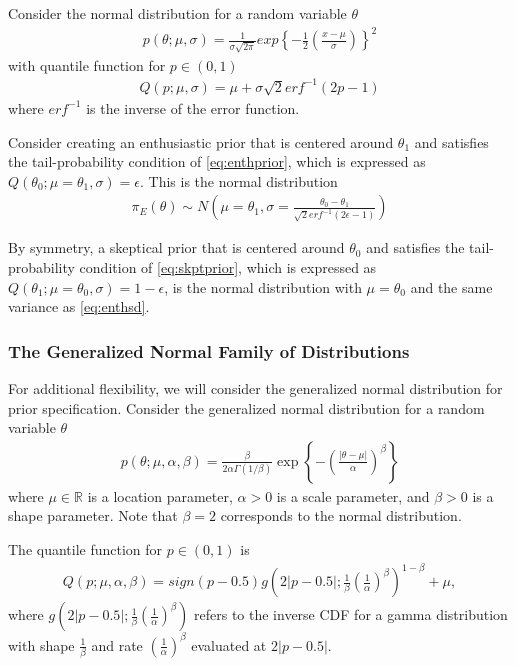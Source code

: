 \documentclass[12pt]{article}
\begin{document}
Consider the normal distribution for a random variable $\theta$
\begin{align}
p(\theta;\mu,\sigma)=\frac{1}{\sigma\sqrt{2\pi}}exp\left\{-\frac{1}{2}\left(\frac{x-\mu}{\sigma}\right)\right\}^2
\end{align}
with quantile function for $p\in(0,1)$
\begin{align}
Q(p;\mu,\sigma)=\mu+\sigma\sqrt{2}erf^{-1}(2p-1)
\end{align}
where $erf^{-1}$ is the inverse of the error function.

Consider creating an enthusiastic prior that is centered around $\theta_1$ and satisfies the tail-probability condition of \eqref{eq:enthprior}, which is expressed as $Q(\theta_0;\mu=\theta_1,\sigma)=\epsilon$. This is the normal distribution 
\begin{align}\label{eq:enthsd}
\pi_E(\theta)\sim N\left(\mu=\theta_1,\sigma=\frac{\theta_0-\theta_1}{\sqrt{2}erf^{-1}(2\epsilon-1)}\right)
\end{align}

By symmetry, a skeptical prior that is centered around $\theta_0$ and satisfies the tail-probability condition of \eqref{eq:skptprior}, which is expressed as $Q(\theta_1;\mu=\theta_0,\sigma)=1-\epsilon$, is the normal distribution with $\mu=\theta_0$ and the same variance as \eqref{eq:enthsd}.

\subsubsection{The Generalized Normal Family of Distributions}
For additional flexibility, we will consider the generalized normal distribution \citep{Nadarajah2005} for prior specification. Consider the generalized normal distribution for a random variable $\theta$ 
\begin{align}\label{eq:generalizednormalkernel}
p(\theta;\mu,\alpha,\beta)=\frac{\beta}{2\alpha\Gamma(1/\beta)}\exp\left\{-\left(\frac{|\theta-\mu|}{\alpha}\right)^\beta\right\}
\end{align} where $\mu\in\mathbb{R}$ is a location parameter, $\alpha>0$ is a scale parameter, and $\beta>0$ is a shape parameter. Note that $\beta=2$ corresponds to the normal distribution. 

The quantile function for $p\in (0,1)$ is 
\begin{align}
Q(p;\mu,\alpha,\beta)=sign(p-0.5) g\left(2|p-0.5|;\frac{1}{\beta}\left(\frac{1}{\alpha}\right)^{\beta}\right)^{1-\beta}+\mu,
\end{align}
where $g\left(2|p-0.5|;\frac{1}{\beta}\left(\frac{1}{\alpha}\right)^{\beta}\right)$ refers to the inverse CDF for a gamma distribution with shape $\frac{1}{\beta}$ and rate $(\frac{1}{\alpha})^\beta$ evaluated at $2|p-0.5|$.
\end{document}
